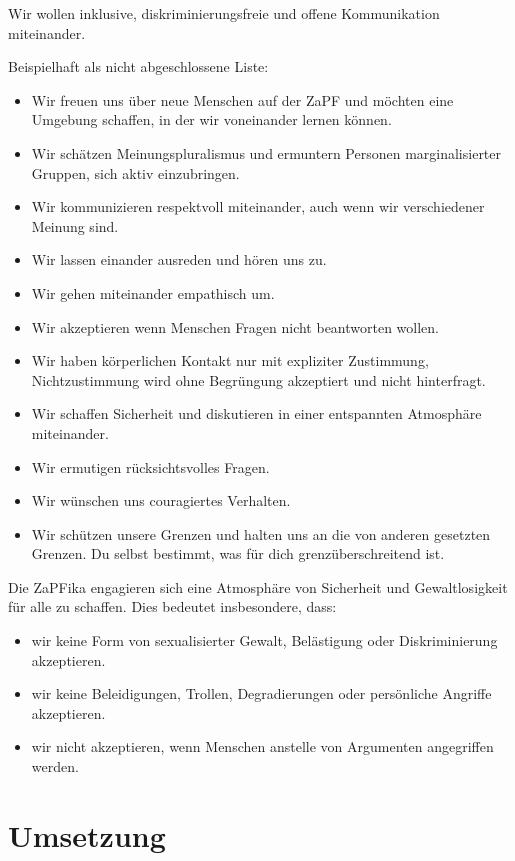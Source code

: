 \documentclass[DIV=calc]{scrartcl}
\begin{document}
Wir wollen inklusive, diskriminierungsfreie und offene Kommunikation
miteinander.

Beispielhaft als nicht abgeschlossene Liste:

\begin{itemize}
\item
  Wir freuen uns über neue Menschen auf der ZaPF und möchten eine
  Umgebung schaffen, in der wir voneinander lernen können.
\item
  Wir schätzen Meinungspluralismus und ermuntern Personen marginalisierter Gruppen, sich aktiv einzubringen.
\item
  Wir kommunizieren respektvoll miteinander, auch wenn wir verschiedener
  Meinung sind.
\item
  Wir lassen einander ausreden und hören uns zu.
\item
  Wir gehen miteinander empathisch um.
\item
  Wir akzeptieren wenn Menschen Fragen nicht beantworten wollen.
\item
  Wir haben körperlichen Kontakt nur mit expliziter Zustimmung,
  Nichtzustimmung wird ohne Begrüngung akzeptiert und nicht hinterfragt.
\item
  Wir schaffen Sicherheit und diskutieren in einer entspannten
  Atmosphäre miteinander.
\item
  Wir ermutigen rücksichtsvolles Fragen.
\item
  Wir wünschen uns couragiertes Verhalten.
\item
  Wir schützen unsere Grenzen und halten uns an die von anderen
  gesetzten Grenzen. Du selbst bestimmt, was für dich grenzüberschreitend
  ist.
\end{itemize}

Die ZaPFika engagieren sich eine Atmosphäre von Sicherheit und
Gewaltlosigkeit für alle zu schaffen. Dies bedeutet insbesondere, dass:

\begin{itemize}
\item
  wir keine Form von sexualisierter Gewalt, Belästigung oder
  Diskriminierung akzeptieren.
\item
  wir keine Beleidigungen, Trollen, Degradierungen oder persönliche
  Angriffe akzeptieren.
\item
  wir nicht akzeptieren, wenn Menschen anstelle von Argumenten angegriffen werden.
\end{itemize}

\hypertarget{umsetzung}{%
\section*{Umsetzung}\label{umsetzung}}
\end{document}
